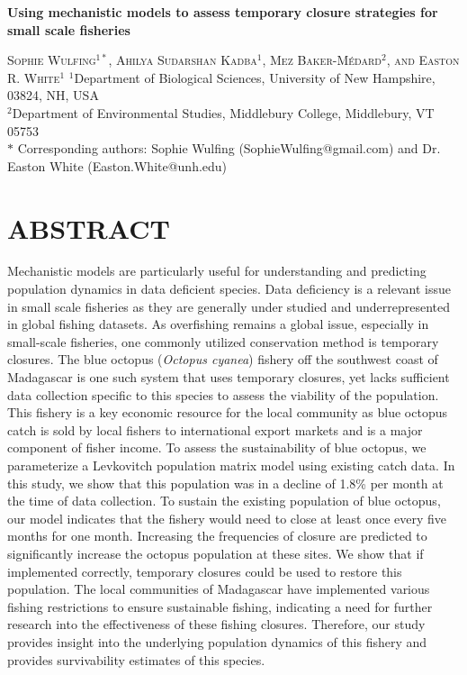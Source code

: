 \documentclass[
]{article}
\author{}
\date{\vspace{-2.5em}}
\begin{document}
\begin{center}
    
\textbf{\Large Using mechanistic models to assess temporary closure strategies for small scale fisheries}
    
\textsc{Sophie Wulfing$^{1*}$, Ahilya Sudarshan Kadba$^{1}$, Mez Baker-Médard$^{2}$, and Easton R. White$^{1}$}
\vspace{3 mm}
\normalsize{\indent $^1$Department of Biological Sciences, University of New Hampshire, 03824, NH, USA \\ $^2$Department of Environmental Studies, Middlebury College, Middlebury, VT 05753\\}
$\text{*}$ Corresponding authors: Sophie Wulfing (SophieWulfing@gmail.com) and Dr. Easton White (Easton.White@unh.edu)
\end{center}

\hypertarget{abstract}{%
\section{ABSTRACT}\label{abstract}}

Mechanistic models are particularly useful for understanding and predicting population dynamics in data deficient species. Data deficiency is a relevant issue in small scale fisheries as they are generally under studied and underrepresented in global fishing datasets. As overfishing remains a global issue, especially in small-scale fisheries, one commonly utilized conservation method is temporary closures. The blue octopus (\emph{Octopus cyanea}) fishery off the southwest coast of Madagascar is one such system that uses temporary closures, yet lacks sufficient data collection specific to this species to assess the viability of the population. This fishery is a key economic resource for the local community as blue octopus catch is sold by local fishers to international export markets and is a major component of fisher income. To assess the sustainability of blue octopus, we parameterize a Levkovitch population matrix model using existing catch data. In this study, we show that this population was in a decline of 1.8\% per month at the time of data collection. To sustain the existing population of blue octopus, our model indicates that the fishery would need to close at least once every five months for one month. Increasing the frequencies of closure are predicted to significantly increase the octopus population at these sites. We show that if implemented correctly, temporary closures could be used to restore this population. The local communities of Madagascar have implemented various fishing restrictions to ensure sustainable fishing, indicating a need for further research into the effectiveness of these fishing closures. Therefore, our study provides insight into the underlying population dynamics of this fishery and provides survivability estimates of this species.
\end{document}
